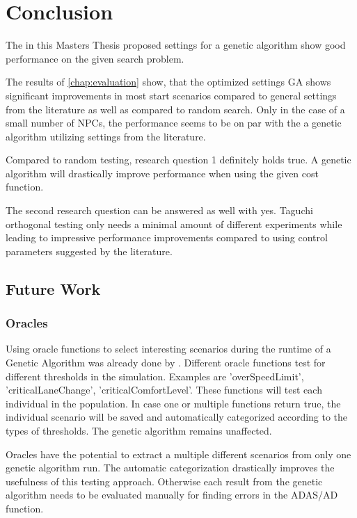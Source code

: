 \chapter{Conclusion}
The in this Masters Thesis proposed settings for a genetic algorithm show good performance on the given search problem.

The results of \ref{chap:evaluation} show, that the optimized settings GA shows significant improvements in most start scenarios compared to general settings from the literature as well as compared to random search. Only in the case of a small number of NPCs, the performance seems to be on par with the a genetic algorithm utilizing settings from the literature.

Compared to random testing, research question 1 definitely holds true. A genetic algorithm will drastically improve performance when using the given cost function.

The second research question can be answered as well with yes. Taguchi orthogonal testing only needs a minimal amount of different experiments while leading to impressive performance improvements compared to using control parameters suggested by the literature.

\section{Future Work}
\subsection{Oracles}
Using oracle functions to select interesting scenarios during the runtime of a Genetic Algorithm was already done by \cite{almanee_scenorita_2021}. Different oracle functions test for different thresholds in the simulation. Examples are 'overSpeedLimit', 'criticalLaneChange', 'criticalComfortLevel'. These functions will test each individual in the population. In case one or multiple functions return true, the individual scenario will be saved and automatically categorized according to the types of thresholds. The genetic algorithm remains unaffected.

Oracles have the potential to extract a multiple different scenarios from only one genetic algorithm run. The automatic categorization drastically improves the usefulness of this testing approach. Otherwise each result from the genetic algorithm needs to be evaluated manually for finding errors in the ADAS/AD function.
